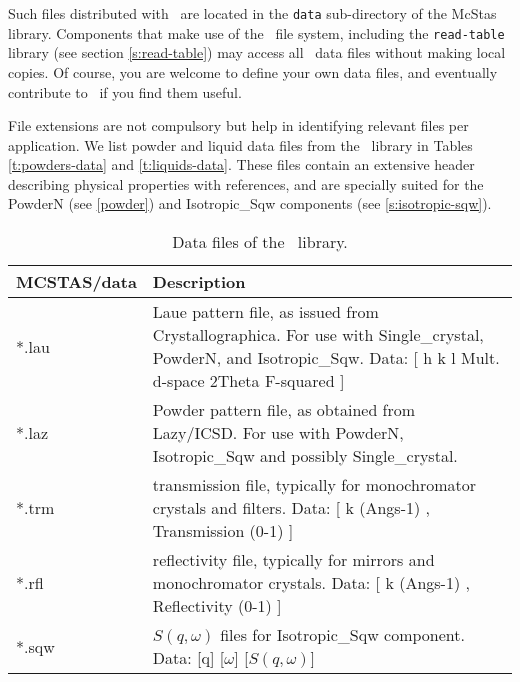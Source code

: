 Such files distributed with \MCS\ are located in the
\verb+data+ sub-directory of the McStas library.
Components that make use of the \MCS\ file system,
including the \verb+read-table+ library (see section \ref{s:read-table})
may access all \MCS\ data files without making local copies.
Of course, you are welcome to define your own data files,
and eventually contribute to \MCS\ if you find them useful.

File extensions are not compulsory but help in identifying relevant files per application. We list powder and liquid data files from the \MCS\ library in Tables \ref{t:powders-data} and \ref{t:liquids-data}. These files contain an extensive header describing physical properties with references, and are specially suited for the PowderN (see \ref{powder}) and Isotropic\_Sqw components (see \ref{s:isotropic-sqw}).

\begin{table}
  \begin{center}
    {\let\my=\\
    \begin{tabular}{|p{}|p{}|}
      \hline
       {\bf MCSTAS/data} & Description \\
       \hline
 *.lau & Laue pattern file, as issued from Crystallographica.
       For use with Single\_crystal, PowderN, and Isotropic\_Sqw.
       Data: [ h   k   l Mult. d-space 2Theta   F-squared ] \\
 *.laz & Powder pattern file, as obtained from Lazy/ICSD.
       For use with PowderN, Isotropic\_Sqw and possibly Single\_crystal.\\
 *.trm & transmission file, typically for monochromator crystals and filters.
       Data: [ k (Angs-1) , Transmission (0-1) ] \\
 *.rfl & reflectivity file, typically for mirrors and monochromator crystals.
       Data: [ k (Angs-1) , Reflectivity (0-1) ] \\
 *.sqw & $S(q,\omega)$ files for Isotropic\_Sqw component.
       Data: [q] [$\omega$] [$S(q,\omega)$]\\
      \hline
    \end{tabular}
    \caption{Data files of the \MCS\ library.}
    \label{t:comp-data}
    }
  \end{center}
\end{table}

